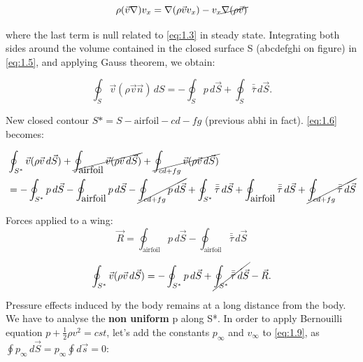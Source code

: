 \documentclass[british,french,11pt, a4paper, openany]{article}
\begin{document}
\begin{equation}
\rho (\vec{v}\nabla ) v_x = \nabla (\rho \vec{v} v_x) - v_x \cancel{\nabla (\rho \vec{v})}
\label{eq:1.5}
\end{equation}

where the last term is null related to \eqref{eq:1.3} in steady state. Integrating both sides around the volume contained in the closed surface S (abcdefghi on figure) in \eqref{eq:1.5}, and applying Gauss theorem, we obtain:

\begin{equation}
\oint _{S} \vec{v} (\rho \vec{v} \vec{n}) \, dS = -\oint _{S} p \, d\vec{S} + \oint _{S} \bar{\bar{\tau}} \, d\vec{S}.
\label{eq:1.6}
\end{equation}		 

New closed contour $S* = S - \mbox{airfoil} - cd - fg$ (previous abhi in fact). \eqref{eq:1.6} becomes:

\begin{equation}
\begin{aligned}
&\oint _{S^*} \vec{v} (\rho \vec{v} \, d\vec{S})  + \cancel{\oint _{\mbox{airfoil}} \vec{v} (\rho \vec{v} \, d\vec{S})} + \cancel{\oint _{cd+fg} \vec{v} (\rho \vec{v} \, d\vec{S})} 
\\&= -\oint _{S^*} p \, d\vec{S} -\oint _{\mbox{airfoil}} p \, d\vec{S}-\cancel{\oint _{cd + fg} p \, d\vec{S}}+ \oint _{S^*} \bar{\bar{\tau}} \, d\vec{S} +\oint _{\mbox{airfoil}} \bar{\bar{\tau}}\, d\vec{S} +\cancel{\oint _{cd + fg} \bar{\bar{\tau}}\, d\vec{S}}
\end{aligned}
\label{eq:1.7}
\end{equation}

Forces applied to a wing:
\begin{equation}
\vec{R} = \oint _{\mbox{airfoil}} p\, d\vec{S} - \oint _{\mbox{airfoil}} \bar{\bar{\tau}}\, d\vec{S}	
\end{equation}

\begin{equation}
\oint _{S^*} \vec{v} (\rho \vec{v} \, d\vec{S}) = -\oint _{S^*} p \, d\vec{S} + \cancel{\oint _{S^*} \bar{\bar{\tau}} \, d\vec{S}} - \vec{R}.
\label{eq:1.9}
\end{equation}

Pressure effects induced by the body remains at a long distance from the body. We have to analyse the \textbf{non uniform} p along S*. In order to apply Bernouilli equation $p + \frac{1}{2}\rho v^2 = cst$, let's add the constants $p_\infty$ and $v_\infty$ to \eqref{eq:1.9}, as $\oint p_\infty\, d\vec{S} = p_\infty \oint d\vec{s} = 0$: 
\end{document}
